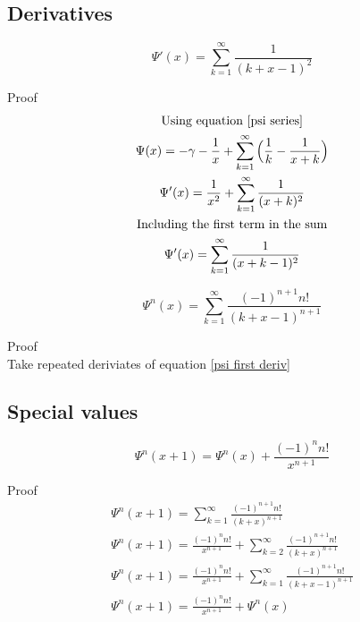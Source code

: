 \documentclass[a4paper]{article}
\begin{document}
\subsection{Derivatives}
\begin{theorem}
\begin{equation} \label{psi first deriv}
\boxed{
\Psi'(x) = \sum_{k=1}^{\infty} \frac{1}{(k+x-1)^2} 
}
\end{equation}

Proof
\\
\begin{gather*}
\text{Using equation \ref{psi series}}
\\
\Psi(x) = -\gamma - \frac{1}{x} + \sum_{k=1}^{\infty} \Big( \frac{1}{k} - \frac{1}{x+k}  \Big)
\\
\Psi'(x) = \frac{1}{x^2} + \sum_{k=1}^{\infty} \frac{1}{(x+k)^2}
\\
\text{Including the first term in the sum}
\\
\Psi'(x) = \sum_{k=1}^{\infty} \frac{1}{(x+k - 1)^2}
\end{gather*}
\end{theorem}

\begin{theorem}
\begin{equation} \label{psi nth deriv}
\boxed{
\Psi^{n}(x) = \sum_{k=1}^{\infty} \frac{(-1)^{n+1} n! }{(k+x-1)^{n+1}} 
}
\end{equation}

Proof
\\
Take repeated deriviates of equation \ref{psi first deriv}
\end{theorem}

\subsection{Special values}
\begin{theorem}
\begin{equation}
\Psi^{n}(x+1) = \Psi^{n}(x) + \frac{(-1)^n n!}{x^{n+1}} 
\end{equation}

Proof
\\
\begin{gather*}
\Psi^{n}(x + 1) = \sum_{k=1}^{\infty} \frac{(-1)^{n+1} n! }{(k+x)^{n+1}}
\\
\Psi^{n}(x + 1) = \frac{(-1)^n n!}{x^{n+1}}  + \sum_{k=2}^{\infty} \frac{(-1)^{n+1} n! }{(k+x)^{n+1}}
\\
\Psi^{n}(x + 1) = \frac{(-1)^n n!}{x^{n+1}}  + \sum_{k=1}^{\infty} \frac{(-1)^{n+1} n! }{(k+x - 1)^{n+1}}
\\
\Psi^{n}(x + 1) = \frac{(-1)^n n!}{x^{n+1}}  + \Psi^{n}(x)
\end{gather*}
\end{theorem}
\end{document}
